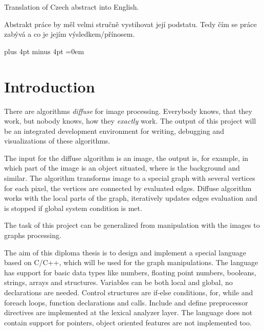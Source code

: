 \documentclass[11pt,twoside,a4paper]{book}
\begin{document}
\abstractpage

Translation of Czech abstract into English.


\vspace{8ex}

\noindent
Abstrakt práce by měl velmi stručně vystihovat její podstatu. Tedy čím se práce zabývá a co je jejím výsledkem/přínosem.




\tableofcontents
\listoffigures
\listoftables



\mainbodystarts

\parskip=5pt plus 4pt minus 4pt
\parindent=0em



\chapter{Introduction}

There are algorithms \textit{diffuse} for image processing. Everybody knows, that they work, but nobody knows, how they \textit{exactly} work. The output of this project will be an integrated development environment for writing, debugging and visualizations of these algorithms.

The input for the diffuse algorithm is an image, the output is, for example, in which part of the image is an object situated, where is the background and similar. The algorithm transforms image to a special graph with several vertices for each pixel, the vertices are connected by evaluated edges. Diffuse algorithm works with the local parts of the graph, iteratively updates edges evaluation and is stopped if global system condition is met.

The task of this project can be generalized from manipulation with the images to graphs processing.

The aim of this diploma thesis is to design and implement a special language based on C/C++, which will be used for the graph manipulations. The language has support for basic data types like numbers, floating point numbers, booleans, strings, arrays and structures. Variables can be both local and global, no declarations are needed. Control structures are if-else conditions, for, while and foreach loops, function declarations and calls. Include and define preprocessor directives are implemented at the lexical analyzer layer. The language does not contain support for pointers, object oriented features are not implemented too.
\end{document}
